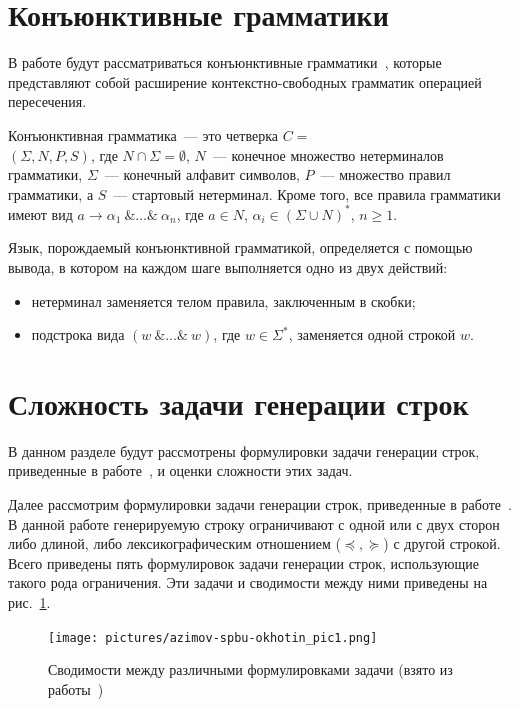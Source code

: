 \section{Конъюнктивные грамматики}
В работе будут рассматриваться конъюнктивные грамматики~\cite{azimov-spbu-conjunctiveGrammar}, которые представляют собой расширение контекстно-свободных грамматик операцией пересечения.

\begin{mydef}
Конъюнктивная грамматика~--- это четверка $C =$ \\ $(\Sigma, N, P, S)$, где $N \cap \Sigma =  \emptyset$, $N$~--- конечное множество нетерминалов грамматики, $\Sigma$~--- конечный алфавит символов, $P$~--- множество правил грамматики, а $S$~--- стартовый нетерминал. Кроме того, все правила грамматики имеют вид $a \rightarrow \alpha_{1}~\& \ldots \&~\alpha_{n}$, где $a \in N$, $\alpha_{i} \in (\Sigma \cup N)^*$, $n \ge 1$.
\end{mydef}

Язык, порождаемый конъюнктивной грамматикой, определяется с помощью вывода, в котором на каждом шаге выполняется одно из двух действий:
\begin{itemize}
    \item нетерминал заменяется телом правила, заключенным в скобки;
    \item подстрока вида $(w~\& \ldots \&~w)$, где $w \in \Sigma^*$, заменяется одной строкой $w$.
\end{itemize}

\section{Сложность задачи генерации строк}
В данном разделе будут рассмотрены формулировки задачи генерации строк, приведенные в работе~\cite{azimov-spbu-Okhotin}, и оценки сложности этих задач.

Далее рассмотрим формулировки задачи генерации строк, приведенные в работе~\cite{azimov-spbu-Okhotin}. В данной работе генерируемую строку ограничивают с одной или с двух сторон либо длиной, либо лексикографическим отношением ($\preceq, \succeq$) с другой строкой. Всего приведены пять формулировок задачи генерации строк, использующие такого рода ограничения. Эти задачи и сводимости между ними приведены на рис.~\ref{azimov-spbu-tasks}.

\begin{figure}[h!]
 \centering
 \texttt{[image: pictures/azimov-spbu-okhotin\_pic1.png]}
 \caption{Сводимости между различными формулировками задачи (взято из работы~\cite{azimov-spbu-Okhotin})}
 \label{azimov-spbu-tasks}
\end{figure}

